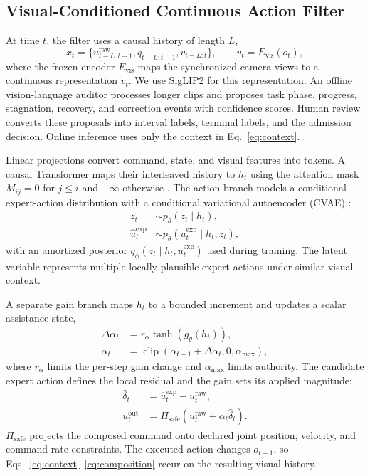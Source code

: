 

\subsection{Visual-Conditioned Continuous Action Filter}
At time $t$, the filter uses a causal history of length $L$,
\begin{equation}
  x_t=\{u^{\mathrm{raw}}_{t-L:t-1},q_{t-L:t-1},v_{t-L:t}\},
  \qquad v_t=E_{\mathrm{vis}}(o_t),
  \label{eq:context}
\end{equation}
where the frozen encoder $E_{\mathrm{vis}}$ maps the synchronized camera views
to a continuous representation $v_t$. We use SigLIP2 for this representation.
An offline vision-language auditor processes longer clips and proposes task
phase, progress, stagnation, recovery, and correction events with confidence
scores. Human review converts these proposals into interval labels, terminal
labels, and the admission decision. Online inference uses only the context in
Eq.~\eqref{eq:context}.

Linear projections convert command, state, and visual features into tokens. A
causal Transformer maps their interleaved history to $h_t$ using the attention
mask $M_{ij}=0$ for $j\leq i$ and $-\infty$ otherwise
\citep{vaswaniAttentionAllYou2023}. The action branch models a conditional
expert-action distribution with a conditional variational autoencoder (CVAE)
\citep{kingmaAutoEncodingVariationalBayes2022}:
\begin{align}
  z_t &\sim p_\theta(z_t\mid h_t), \\
  \hat u^{\mathrm{exp}}_t &\sim
  p_\theta(u^{\mathrm{exp}}_t\mid h_t,z_t),
  \label{eq:cvae_action}
\end{align}
with an amortized posterior
$q_\phi(z_t\mid h_t,u^{\mathrm{exp}}_t)$ used during training. The latent
variable represents multiple locally plausible expert actions under similar
visual context.

A separate gain branch maps $h_t$ to a bounded increment and updates a scalar
assistance state,
\begin{align}
  \Delta\alpha_t &= r_\alpha\tanh(g_\theta(h_t)), \\
  \alpha_t &= \operatorname{clip}
  (\alpha_{t-1}+\Delta\alpha_t,0,\alpha_{\max}),
  \label{eq:gain}
\end{align}
where $r_\alpha$ limits the per-step gain change and $\alpha_{\max}$ limits
authority. The candidate expert action defines the local residual and the gain
sets its applied magnitude:
\begin{align}
  \hat\delta_t &= \hat u^{\mathrm{exp}}_t-u^{\mathrm{raw}}_t, \\
  u^{\mathrm{out}}_t &= \Pi_{\mathrm{safe}}\!\left(
  u^{\mathrm{raw}}_t+\alpha_t\hat\delta_t\right).
  \label{eq:composition}
\end{align}
$\Pi_{\mathrm{safe}}$ projects the composed command onto declared joint
position, velocity, and command-rate constraints. The executed action changes
$o_{t+1}$, so Eqs.~\eqref{eq:context}--\eqref{eq:composition} recur on the
resulting visual history.

